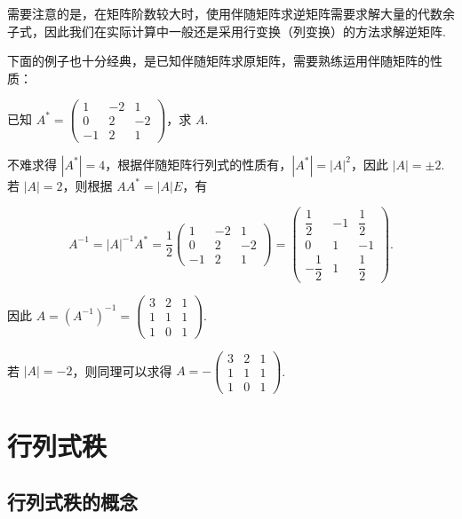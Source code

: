 需要注意的是，在矩阵阶数较大时，使用伴随矩阵求逆矩阵需要求解大量的代数余子式，因此我们在实际计算中一般还是采用行变换（列变换）的方法求解逆矩阵.

下面的例子也十分经典，是已知伴随矩阵求原矩阵，需要熟练运用伴随矩阵的性质：

\begin{example}{}{}
    已知 $A^*=\begin{pmatrix}
            1 & -2 & 1 \\ 0 & 2 & -2 \\ -1 & 2 & 1
        \end{pmatrix}$，求 $A$.
\end{example}

\begin{solution}
    不难求得 $|A^*| = 4$，根据伴随矩阵行列式的性质有，$|A^*| = |A|^2$，因此 $|A| = \pm 2$. 若 $|A| = 2$，则根据 $AA^* = |A|E$，有

    \[A^{-1} = |A|^{-1}A^* = \frac{1}{2}\begin{pmatrix}
            1 & -2 & 1 \\ 0 & 2 & -2 \\ -1 & 2 & 1
        \end{pmatrix} = \begin{pmatrix}
            \dfrac{1}{2} & -1 & \dfrac{1}{2} \\ 0 & 1 & -1 \\ -\dfrac{1}{2} & 1 & \dfrac{1}{2}
        \end{pmatrix}.\]

    因此 $A = (A^{-1})^{-1} = \begin{pmatrix}
            3 & 2 & 1 \\ 1 & 1 & 1 \\ 1 & 0 & 1
        \end{pmatrix}$.

    若 $|A| = -2$，则同理可以求得 $A = -\begin{pmatrix}
            3 & 2 & 1 \\ 1 & 1 & 1 \\ 1 & 0 & 1
        \end{pmatrix}$.
\end{solution}


\section{行列式秩}

\subsection{行列式秩的概念}

